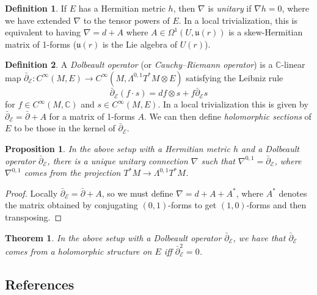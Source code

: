 \documentclass{article}
\newtheorem*{theorem}{Theorem}
\newtheorem*{proposition}{Proposition}
\theoremstyle{definition}
\newtheorem*{definition}{Definition}
\newcommand{\E}{\mathcal{E}}
\renewcommand{\u}{\mathfrak{u}}
\newcommand{\C}{\mathbb{C}}
\begin{document}
\begin{definition}
    If $E$ has a Hermitian metric $h$, then $\nabla$ is \emph{unitary} if
    $\nabla h=0$, where we have extended $\nabla$ to the tensor powers of $E$.
    In a local trivialization, this is equivalent to having $\nabla=d+A$ where
    $A\in\Omega^1(U,\u(r))$ is a skew-Hermitian matrix of 1-forms ($\u(r)$ is
    the Lie algebra of $U(r)$).
\end{definition}

\begin{definition}
    A \emph{Dolbeault operator} (or \emph{Cauchy--Riemann operator}) is a
    $\C$-linear map
    $\bar\partial_\E:C^\infty(M,E)\to C^\infty(M,\Lambda^{0,1}T^*M\otimes E)$
    satisfying the Leibniz rule
    \begin{equation*}
        \bar\partial_\E(f\cdot s) = df\otimes s + f\bar\partial_\E s
    \end{equation*}
    for $f\in C^\infty(M,\C)$ and $s\in C^\infty(M,E)$. In a local
    trivialization this is given by $\bar\partial_\E=\bar\partial+A$ for a
    matrix of 1-forms $A$. We can then define \emph{holomorphic sections} of $E$
    to be those in the kernel of $\bar\partial_\E$.
\end{definition}

\begin{proposition}
    In the above setup with a Hermitian metric $h$ and a Dolbeault operator
    $\bar\partial_\E$, there is a unique unitary connection $\nabla$ such that
    $\nabla^{0,1}=\bar\partial_\E$, where $\nabla^{0,1}$ comes from the
    projection $T^*M\to\Lambda^{0,1}T^*M$.
\end{proposition}

\begin{proof}
    Locally $\bar\partial_\E=\bar\partial+A$, so we must define $\nabla=d+A+A^*$,
    where $A^*$ denotes the matrix obtained by conjugating $(0,1)$-forms to get
    $(1,0)$-forms and then transposing.
\end{proof}

\begin{theorem}
    In the above setup with a Dolbeault operator $\bar\partial_\E$, we have that
    $\bar\partial_\E$ comes from a holomorphic structure on $E$ iff
    $\bar\partial_\E^2=0$.
\end{theorem}

\subsection*{References}
\end{document}
